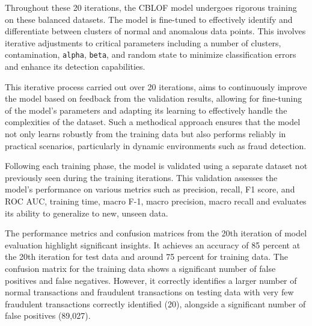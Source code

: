\documentclass[journal]{IEEEtran}
\begin{document}
Throughout these 20 iterations, the CBLOF model undergoes rigorous training on these balanced datasets. The model is fine-tuned to effectively identify and differentiate between clusters of normal and anomalous data points. This involves iterative adjustments to critical parameters including a number of clusters, contamination, \verb|alpha|, \verb|beta|, and random state to minimize classification errors and enhance its detection capabilities.


This iterative process carried out over 20 iterations, aims to continuously improve the model based on feedback from the validation results, allowing for fine-tuning of the model's parameters and adapting its learning to effectively handle the complexities of the dataset. Such a methodical approach ensures that the model not only learns robustly from the training data but also performs reliably in practical scenarios, particularly in dynamic environments such as fraud detection.

Following each training phase, the model is validated using a separate dataset not previously seen during the training iterations. This validation assesses the model’s performance on various metrics such as precision, recall, F1 score, and ROC AUC, training time, macro F-1, macro precision, macro recall and evaluates its ability to generalize to new, unseen data. 


The performance metrics and confusion matrices from the 20th iteration of model evaluation highlight significant insights. It achieves an accuracy of 85 percent at the 20th iteration for test data and around 75 percent for training data. The confusion matrix for the training data shows a significant number of false positives and false negatives. However, it correctly identifies a larger number of normal transactions and fraudulent transactions on testing data with very few fraudulent transactions correctly identified (20), alongside a significant number of false positives (89,027).
\end{document}
